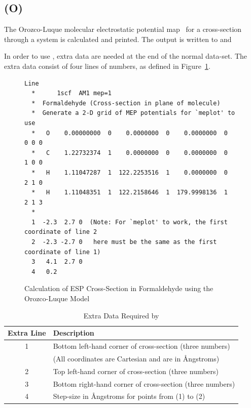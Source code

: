 \subsection*{ (O)}
The Orozco-Luque molecular electrostatic potential map~\cite{lo3} for
a cross-section through
a system is calculated and printed. The output is
written to  and 


In order to use , extra data are needed at the end of the normal
data-set.  The extra data consist of four lines of numbers, as defined in
Figure~\ref{mep1}.
\begin{figure}
\begin{makeimage}
\end{makeimage}
\compresstable
\begin{verbatim}
Line
  *      1scf  AM1 mep=1
  *  Formaldehyde (Cross-section in plane of molecule)
  *  Generate a 2-D grid of MEP potentials for `meplot' to use
  *   O    0.00000000  0    0.0000000  0    0.0000000  0    0 0 0
  *   C    1.22732374  1    0.0000000  0    0.0000000  0    1 0 0
  *   H    1.11047287  1  122.2253516  1    0.0000000  0    2 1 0
  *   H    1.11048351  1  122.2158646  1  179.9998136  1    2 1 3
  *
  1  -2.3  2.7 0  (Note: For `meplot' to work, the first coordinate of line 2
  2  -2.3 -2.7 0   here must be the same as the first coordinate of line 1)
  3   4.1  2.7 0
  4   0.2
\end{verbatim}
\caption{\label{mep1data}Calculation of ESP Cross-Section in  Formaldehyde
 using the Orozco-Luque Model}
\end{figure}
\begin{table}
\caption{\label{mep1} Extra Data Required by }
\begin{tabular}{cl}\\ \hline
Extra Line   &   Description \\ \hline
1            &   Bottom left-hand corner of cross-section (three numbers) \\
             &   (All coordinates are Cartesian and are in \AA ngstroms) \\
2            &   Top left-hand corner of cross-section (three numbers) \\
3            &   Bottom right-hand corner of cross-section (three numbers) \\
4            &   Step-size in \AA ngstroms for points from (1) to (2) \\
\hline
\end{tabular}
\end{table}

